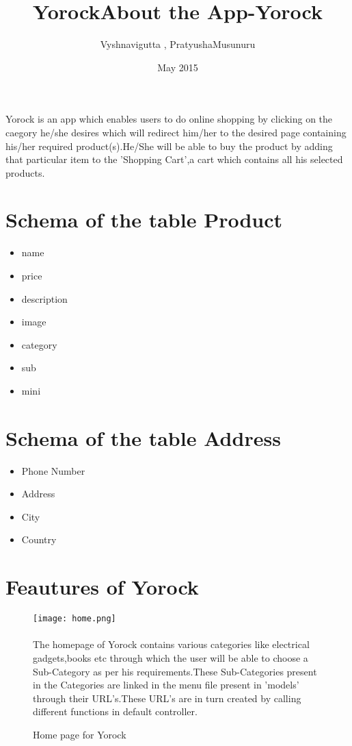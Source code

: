 \documentclass[a4paper]{article}
\title{Yorock}
\author{Vyshnavigutta , PratyushaMusunuru}
\date{May 2015}
\begin{document}
\maketitle

\title{About the App-Yorock}
\paragraph{}
Yorock is an app which enables users to do online shopping by clicking on the caegory he/she desires  which  will redirect him/her to the desired page containing his/her required product(s).He/She will be able to buy the product by adding that particular item to the 'Shopping Cart',a cart which contains all his selected products.

\section{Schema of the table Product}
\begin{itemize}
\item name
\item price
\item description
\item image
\item category
\item sub
\item mini
\end{itemize}


\section{Schema of the table Address}
\begin{itemize}
\item Phone Number
\item Address
\item City
\item Country
\end{itemize}


\section{Feautures of Yorock}
\begin{figure}[h!]
\centering
\texttt{[image: home.png]}
\caption{Home page for Yorock}
\label{fig:Home}
\paragraph{}
The homepage of  Yorock contains various categories like electrical gadgets,books etc through which the user will be able to choose a Sub-Category as per his requirements.These Sub-Categories present in the Categories are linked in the menu file present in 'models' through their URL's.These URL's are in turn created by calling different functions in default controller.  
\end{figure}
\newpage
\end{document}
